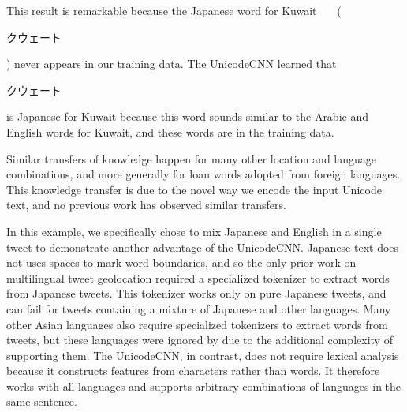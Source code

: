 \documentclass[sigconf,anonymous,review]{acmart}
\newcommand{\defn}[1]{\textit{#1}}
\newcommand{\ignore}[1]{}
\newcommand{\fixme}[1]{\textcolor{red}{\textbf{FIXME:} {#1}}}
\begin{document}
\begin{description}
\noindent
This result is remarkable because the Japanese word for Kuwait ~~~(\begin{CJK}{UTF8}{min}クウェート\end{CJK}) never appears in our training data.
The UnicodeCNN learned that \begin{CJK}{UTF8}{min}クウェート\end{CJK} is Japanese for Kuwait because this word sounds similar to the Arabic and English words for Kuwait,
    and these words are in the training data.
    \ignore{
Furthermore, if we misspell the Japanese word for Kuwait (for example as \begin{CJK}{UTF8}{min}ウェート\end{CJK}),
then the UnicodeCNN still understands that the location referred to is Kuwait.
The model's output in this case is
\noindent
}
\noindent
Similar transfers of knowledge happen for many other location and language combinations,
and more generally for loan words adopted from foreign languages.
This knowledge transfer is due to the novel way we encode the input Unicode text,
and no previous work has observed similar transfers.

In this example, we specifically chose to mix Japanese and English in a single tweet to demonstrate another advantage of the UnicodeCNN.
Japanese text does not uses spaces to mark word boundaries, 
and so the only prior work on multilingual tweet geolocation \citep{han2014text} required a specialized tokenizer to extract words from Japanese tweets.
This tokenizer works only on pure Japanese tweets,
and can fail for tweets containing a mixture of Japanese and other languages.
Many other Asian languages also require specialized tokenizers to extract words from tweets,
but these languages were ignored by \citep{han2014text} due to the additional complexity of supporting them.
The UnicodeCNN, in contrast, does not require lexical analysis because it constructs features from characters rather than words.
It therefore works with all languages and supports arbitrary combinations of languages in the same sentence.


\end{description}
\end{document}
